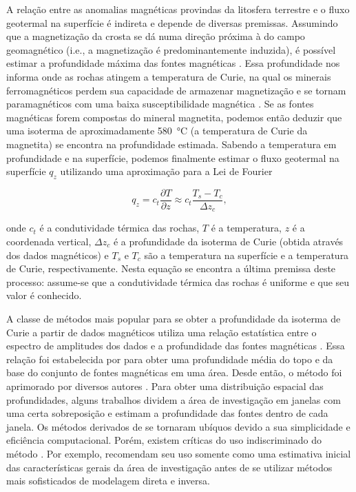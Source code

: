 \documentclass[11pt,a4paper,oneside]{book}
\begin{document}
A relação entre as anomalias magnéticas provindas da litosfera terrestre e o
fluxo geotermal na superfície é indireta e depende de diversas premissas.
Assumindo que a magnetização da crosta se dá numa direção próxima à do campo
geomagnético (i.e., a magnetização é predominantemente induzida), é possível
estimar a profundidade máxima das fontes magnéticas \citep{Spector1970}.
Essa profundidade nos informa onde as rochas atingem a temperatura de Curie,
na qual os minerais ferromagnéticos perdem sua capacidade de armazenar
magnetização e se tornam paramagnéticos com uma baixa susceptibilidade
magnética \citep{Blakely1988}.
Se as fontes magnéticas forem compostas do mineral magnetita, podemos então
deduzir que uma isoterma de aproximadamente \qty{580}{\degreeCelsius} (a
temperatura de Curie da magnetita) se encontra na profundidade estimada.
Sabendo a temperatura em profundidade e na superfície, podemos finalmente
estimar o fluxo geotermal na superfície $q_z$ utilizando uma aproximação para a
Lei de Fourier

\begin{equation}
  q_z = c_t \dfrac{\partial T}{\partial z} \approx c_t \dfrac{T_s - T_c}{\Delta z_c},
\end{equation}

\noindent
onde $c_t$ é a condutividade térmica das rochas, $T$ é a temperatura, $z$ é a
coordenada vertical, $\Delta z_c$ é a profundidade da isoterma de Curie (obtida
através dos dados magnéticos) e $T_s$ e $T_c$ são a temperatura na superfície e
a temperatura de Curie, respectivamente.
Nesta equação se encontra a última premissa deste processo: assume-se que a
condutividade térmica das rochas é uniforme e que seu valor é conhecido.

A classe de métodos mais popular para se obter a profundidade da isoterma de
Curie a partir de dados magnéticos utiliza uma relação estatística entre o
espectro de amplitudes dos dados e a profundidade das fontes magnéticas
\citep{BurtonJohnson2020}.
Essa relação foi estabelecida por \citet{Spector1970} para obter uma
profundidade média do topo e da base do conjunto de fontes magnéticas em uma
área.
Desde então, o método foi aprimorado por diversos autores \citep[uma revisão
dos métodos e suas limitações pode ser encontrada em ][]{NunezDemarco2020}.
Para obter uma distribuição espacial das profundidades, alguns trabalhos
dividem a área de investigação em janelas com uma certa sobreposição e estimam
a profundidade das fontes dentro de cada janela.
Os métodos derivados de \citet{Spector1970} se tornaram ubíquos devido a sua
simplicidade e eficiência computacional.
Porém, existem críticas do uso indiscriminado do método
\citep{Johnson2016,NunezDemarco2020}.
Por exemplo, \citet{Johnson2016} recomendam seu uso somente como uma estimativa
inicial das características gerais da área de investigação antes de se utilizar
métodos mais sofisticados de modelagem direta e inversa.
\end{document}
